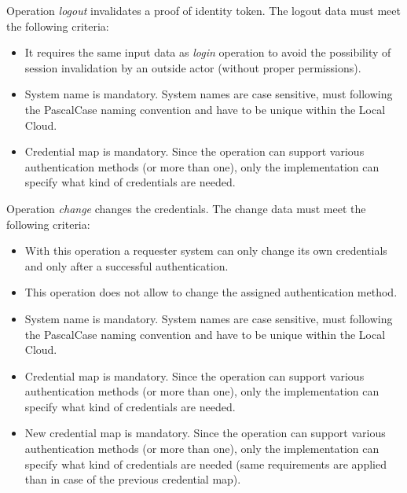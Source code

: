 \documentclass[a4paper]{arrowhead}
\begin{document}

Operation \textit{logout} invalidates a proof of identity token. The logout data must meet the following criteria:

\begin{itemize}
    \item It requires the same input data as \textit{login} operation to avoid the possibility of session invalidation by an outside actor (without proper permissions). 
    \item System name is mandatory. System names are case sensitive, must following the PascalCase naming convention and have to be unique within the Local Cloud.
    \item Credential map is mandatory. Since the operation can support various authentication methods (or more than one), only the implementation can specify what kind of credentials are needed.
\end{itemize}


Operation \textit{change} changes the credentials. The change data must meet the following criteria:

\begin{itemize}
    \item With this operation a requester system can only change its own credentials and only after a successful authentication.
    \item This operation does not allow to change the assigned authentication method.
    \item System name is mandatory. System names are case sensitive, must following the PascalCase naming convention and have to be unique within the Local Cloud.
    \item Credential map is mandatory. Since the operation can support various authentication methods (or more than one), only the implementation can specify what kind of credentials are needed.
    \item New credential map is mandatory. Since the operation can support various authentication methods (or more than one), only the implementation can specify what kind of credentials are needed (same requirements are applied than in case of the previous credential map). 
\end{itemize}

\end{document}
